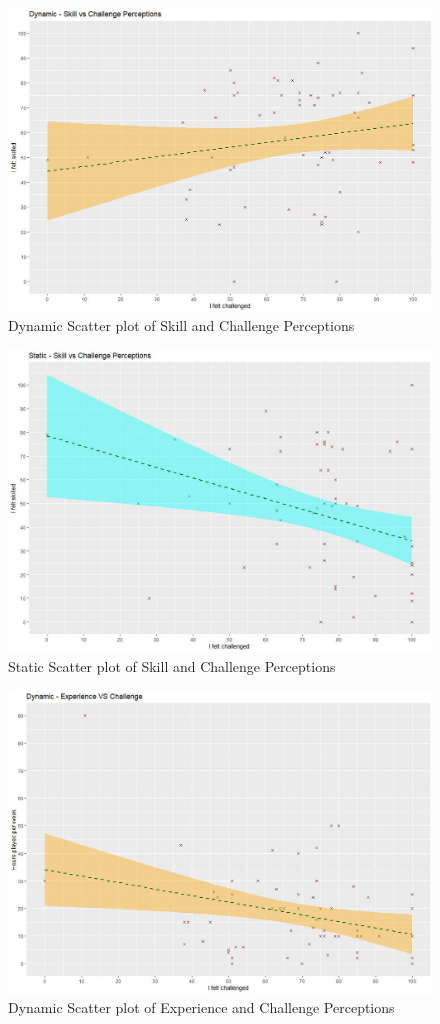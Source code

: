 \documentclass[journal]{IEEEtran}
\begin{document}
\begin{figure}[h]
	\includegraphics[width=0.75\linewidth]{dynamicchallengevsskilled.jpg}
	\caption{Dynamic Scatter plot of Skill and Challenge Perceptions}
	\label{Analysis Test}
\end{figure} 

\begin{figure}[h]
	\includegraphics[width=0.75\linewidth]{staticchallengevsskilled.jpg}
	\caption{Static Scatter plot of Skill and Challenge Perceptions}
	\label{Analysis Test}
\end{figure} 

\begin{figure}[h]
	\includegraphics[width=0.75\linewidth]{dynamicexpvschallenge.jpg}
	\caption{Dynamic Scatter plot of Experience and Challenge Perceptions}
	\label{Analysis Test}
\end{figure}
\end{document}
